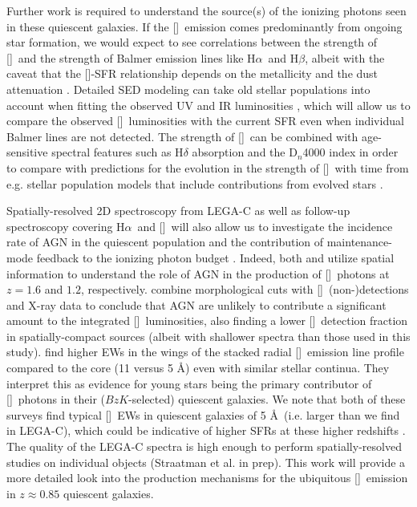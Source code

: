 \documentclass[twocolumn,natbib,iop,hyperref]{aastex62}
\newcommand{\msol}{M$_{\odot}$}
\newcommand{\nii}{[\ion{N}{2}]}
\newcommand{\hb}{H$\beta$}
\newcommand{\oii}{[\ion{O}{2}]}
\newcommand{\ha}{H$\alpha$}
\begin{document}
Further work is required to understand the source(s) of the ionizing photons seen in these quiescent galaxies.  If the \oii\ emission comes predominantly from ongoing star formation, we would expect to see correlations between the strength of \oii\ and the strength of Balmer emission lines like \ha\ and \hb, albeit with the caveat that the \oii-SFR relationship depends on the metallicity and the dust attenuation \cite[e.g.][]{2001ApJ...551..825J}.  Detailed SED modeling can take old stellar populations into account when fitting the observed UV and IR luminosities \citep{2019ApJ...877..140L}, which will allow us to compare the observed \oii\ luminosities with the current SFR even when individual Balmer lines are not detected.  The strength of \oii\ can be combined with age-sensitive spectral features such as H$\delta$ absorption and the D$_n$4000 index in order to compare with predictions for the evolution in the strength of \oii\ with time from e.g. stellar population models that include contributions from evolved stars \citep{Byler_2019}.

Spatially-resolved 2D spectroscopy from LEGA-C as well as follow-up spectroscopy covering \ha\ and \nii\ will also allow us to investigate the incidence rate of AGN in the quiescent population and the contribution of maintenance-mode feedback to the ionizing photon budget \citep{2013ApJ...770L..39W}.  Indeed, both \citet{2017AA...599A..95G} and \citet{2017ApJ...838...94W} utilize spatial information to understand the role of AGN in the production of \oii\ photons at $z = 1.6$ and $1.2$, respectively.  \citet{2017ApJ...838...94W} combine morphological cuts with \oii\ (non-)detections and X-ray data to conclude that AGN are unlikely to contribute a significant amount to the integrated \oii\ luminosities, also finding a lower \oii\ detection fraction in spatially-compact sources (albeit with shallower spectra than those used in this study).  \citet{2017AA...599A..95G} find higher EWs in the wings of the stacked radial \oii\ emission line profile compared to the core (11 versus 5 \AA) even with similar stellar continua.  They interpret this as evidence for young stars being the primary contributor of \oii\ photons in their ($BzK$-selected) quiescent galaxies.  We note that both of these surveys find typical \oii\ EWs in quiescent galaxies of 5 \AA\ (i.e. larger than we find in LEGA-C), which could be indicative of higher SFRs at these higher redshifts \cite[e.g. 4.5 \msol\ yr$^{-1}$ in \citeauthor{2017AA...599A..95G} \citeyear{2017AA...599A..95G}; see also][]{2014ApJ...796...35F}.  The quality of the LEGA-C spectra is high enough to perform spatially-resolved studies on individual objects (Straatman et al. in prep).  This work will provide a more detailed look into the production mechanisms for the ubiquitous \oii\ emission in $z\approx0.85$ quiescent galaxies.
\end{document}
